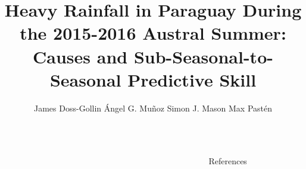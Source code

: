 \documentclass[serif,mathserif,final]{beamer}
\title{Heavy Rainfall in Paraguay During the 2015-2016 Austral Summer: Causes and Sub-Seasonal-to-Seasonal Predictive Skill}
\author{James Doss-Gollin\inst{1} \quad \'{A}ngel G. Mu\~{n}oz\inst{2} \quad Simon J. Mason\inst{2} \quad Max Past\'{e}n\inst{3}}
\institute
{\inst{1} Columbia Water Center, Columbia University \inst{2} International Research Institute for Climate and Society, Columbia University \inst{3} Direcci\'{o}n de Meteorolog\'{i}a e Hidrolog\'{i}a, Paraguay}
\begin{document}
\begin{frame}{}
  \begin{columns}[t]

    \begin{column}{0.22\linewidth}

        
        

    \end{column}%

    \begin{column}{0.22\linewidth}

      
        

    \end{column}%

    \begin{column}{0.22\linewidth}

      
      

    \end{column}%


    \begin{column}{0.22\linewidth}

      
      

      \begin{block}{References}
          \renewcommand*{\bibfont}{\footnotesize}
          \printbibliography[heading=none]
      \end{block}

    \end{column}%

  \end{columns}
\end{frame}
\end{document}
